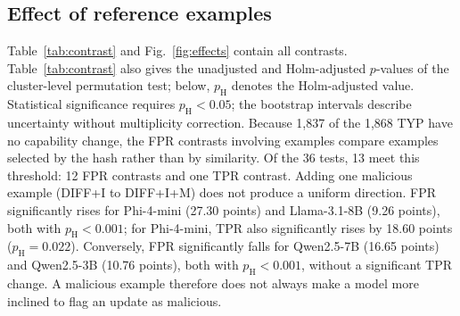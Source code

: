\documentclass[a4paper,fleqn]{cas-dc}
\begin{document}
\subsection{Effect of reference examples}
Table~\ref{tab:contrast} and Fig.~\ref{fig:effects} contain all contrasts.
Table~\ref{tab:contrast} also gives the unadjusted and Holm-adjusted $p$-values
of the cluster-level permutation test; below, $p_{\mathrm{H}}$ denotes the
Holm-adjusted value. Statistical significance requires $p_{\mathrm{H}} < 0.05$;
the bootstrap intervals describe uncertainty without multiplicity correction.
Because 1,837 of the 1,868 TYP have no capability change, the FPR contrasts
involving examples compare examples selected by the hash rather than by
similarity.
Of the 36 tests, 13 meet this threshold: 12 FPR contrasts and one TPR contrast.
Adding one malicious example (DIFF+I to DIFF+I+M) does not produce a uniform
direction. FPR significantly rises for Phi-4-mini (27.30 points) and
Llama-3.1-8B (9.26 points), both with $p_{\mathrm{H}} < 0.001$; for Phi-4-mini,
TPR also significantly rises by 18.60 points ($p_{\mathrm{H}} = 0.022$).
Conversely, FPR significantly falls for Qwen2.5-7B (16.65 points) and
Qwen2.5-3B (10.76 points), both with $p_{\mathrm{H}} < 0.001$, without a
significant TPR change. A malicious example therefore does not always make a
model more inclined to flag an update as malicious.
\end{document}
